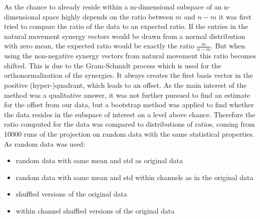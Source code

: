 As the chance to already reside within a m-dimensional subspace of an n-dimensional space highly depends on the ratio between $m$ and $n - m$ it was first tried to compare the ratio of the data to an expected ratio. If the entries in the natural movement synergy vectors would be drawn from a normal distribution with zero mean, the expected ratio would be exactly the ratio $\frac{m}{n - m}$. But when using the non-negative synergy vectors from natural movement this ratio becomes shifted. This is due to the Gram-Schmidt process which is used for the orthonormalization of the synergies. It always creates the first basis vector in the positive (hyper-)quadrant, which leads to an offset. As the main interest of the method was a qualitative answer, it was not further pursued to find an estimate for the offset from our data, but a bootstrap method was applied to find whether the data resides in the subspace of interest on a level above chance. Therefore the ratio computed for the data was compared to distributions of ratios, coming from 10000 runs of the projection on random data with the same statistical properties. As random data was used:

\begin{itemize}
	\item random data with same mean and std as original data
	\item random data with same mean and std within channels as in the original data
	\item shuffled versions of the original data
	\item within channel shuffled versions of the original data
\end{itemize}










